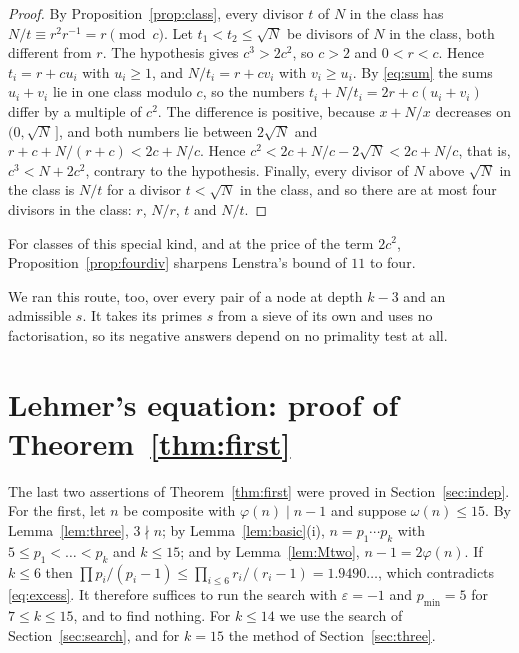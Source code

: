 \documentclass[screen,reqno]{aomart}
\numberwithin{equation}{section}
\theoremstyle{plain}
\theoremstyle{definition}
\theoremstyle{remark}
\begin{document}
\begin{proof}
By Proposition~\ref{prop:class}, every divisor $t$ of $N$ in the
class has $N/t\equiv r^2r^{-1}=r\pmod c$. Let $t_1<t_2\le\sqrt N$ be
divisors of $N$ in the class, both different from $r$. The hypothesis
gives $c^3>2c^2$, so $c>2$ and $0<r<c$. Hence $t_i=r+cu_i$ with
$u_i\ge1$, and $N/t_i=r+cv_i$ with $v_i\ge u_i$. By \eqref{eq:sum} the sums
$u_i+v_i$ lie in one class modulo $c$, so the numbers
$t_i+N/t_i=2r+c(u_i+v_i)$ differ by a multiple of $c^2$. The difference
is positive, because $x+N/x$ decreases on $(0,\sqrt N\,]$, and both
numbers lie between $2\sqrt N$ and $r+c+N/(r+c)<2c+N/c$. Hence
$c^2<2c+N/c-2\sqrt N<2c+N/c$, that is, $c^3<N+2c^2$, contrary to the
hypothesis. Finally, every divisor of $N$ above $\sqrt N$ in the class
is $N/t$ for a divisor $t<\sqrt N$ in the class, and so there are at
most four divisors in the class: $r$, $N/r$, $t$ and $N/t$.
\end{proof}

For classes of this special kind, and at the price of the term $2c^2$,
Proposition~\ref{prop:fourdiv} sharpens Lenstra's bound of $11$ to
four.

We ran this route, too, over every pair of a node at depth $k-3$ and
an admissible $s$. It takes its primes $s$ from a sieve of its own and
uses no factorisation, so its negative answers depend on no primality
test at all.

\section{Lehmer's equation: proof of Theorem~\ref{thm:first}}\label{sec:first}

The last two assertions of Theorem~\ref{thm:first} were proved in
Section~\ref{sec:indep}. For the first, let $n$ be composite with
$\varphi(n)\mid n-1$ and suppose $\omega(n)\le15$. By
Lemma~\ref{lem:three}, $3\nmid n$; by
Lemma~\ref{lem:basic}(i), $n=p_1\cdots p_k$ with $5\le p_1<\dots<p_k$
and $k\le15$; and by Lemma~\ref{lem:Mtwo}, $n-1=2\varphi(n)$. If
$k\le6$ then $\prod p_i/(p_i-1)\le\prod_{i\le6}r_i/(r_i-1)=1.9490\ldots$,
which contradicts \eqref{eq:excess}. It therefore suffices to run the
search with $\varepsilon=-1$ and $p_{\min}=5$ for $7\le k\le15$, and to
find nothing. For $k\le14$ we use the search of
Section~\ref{sec:search}, and for $k=15$ the method of
Section~\ref{sec:three}.
\end{document}
